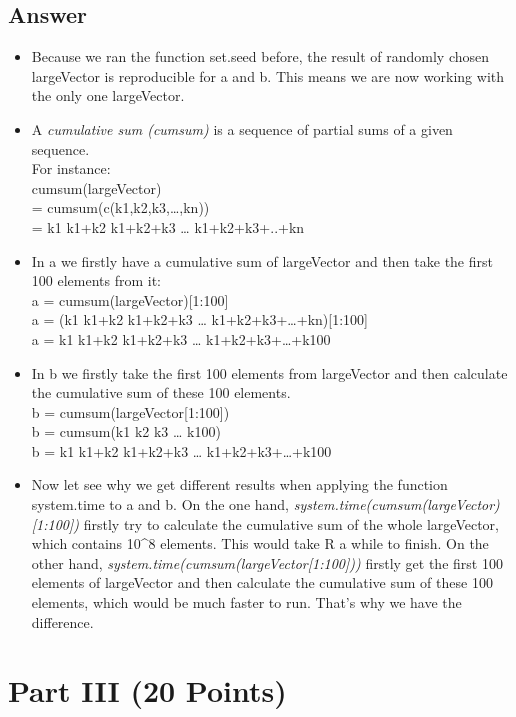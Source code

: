 \documentclass[12,]{article}
\begin{document}
\subsection{Answer}\label{answer-1}

\begin{itemize}
\item
  Because we ran the function set.seed before, the result of randomly
  chosen largeVector is reproducible for a and b. This means we are now
  working with the only one largeVector.
\item
  A \emph{cumulative sum (cumsum)} is a sequence of partial sums of a
  given sequence.\\
  For instance:\\
  cumsum(largeVector)\\
  = cumsum(c(k1,k2,k3,\ldots{},kn))\\
  = k1 k1+k2 k1+k2+k3 \ldots{} k1+k2+k3+..+kn
\item
  In a we firstly have a cumulative sum of largeVector and then take the
  first 100 elements from it:\\
  a = cumsum(largeVector){[}1:100{]}\\
  a = (k1 k1+k2 k1+k2+k3 \ldots{} k1+k2+k3+\ldots{}+kn){[}1:100{]}\\
  a = k1 k1+k2 k1+k2+k3 \ldots{} k1+k2+k3+\ldots{}+k100
\item
  In b we firstly take the first 100 elements from largeVector and then
  calculate the cumulative sum of these 100 elements.\\
  b = cumsum(largeVector{[}1:100{]})\\
  b = cumsum(k1 k2 k3 \ldots{} k100)\\
  b = k1 k1+k2 k1+k2+k3 \ldots{} k1+k2+k3+\ldots{}+k100
\item
  Now let see why we get different results when applying the function
  system.time to a and b. On the one hand,
  \emph{system.time(cumsum(largeVector){[}1:100{]})} firstly try to
  calculate the cumulative sum of the whole largeVector, which contains
  10\^{}8 elements. This would take R a while to finish. On the other
  hand, \emph{system.time(cumsum(largeVector{[}1:100{]}))} firstly get
  the first 100 elements of largeVector and then calculate the
  cumulative sum of these 100 elements, which would be much faster to
  run. That's why we have the difference.
\end{itemize}

\section{Part III (20 Points)}\label{part-iii-20-points}
\end{document}
